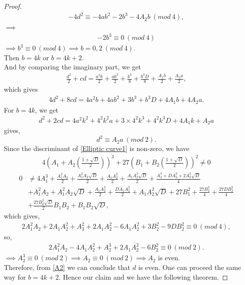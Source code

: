 \documentclass[10pt,a4paper]{amsart}
\begin{document}
\begin{proof}
\begin{align*}
         -4d^2\equiv -4ab^2-2b^3-4A_2b~(mod~4),
    \end{align*}
    $\implies$
    \begin{align*}
        -2b^3\equiv0~(mod~4)
    \end{align*}
   $\implies b^3\equiv0~(mod~4)\implies b=0,2~(mod~4)$.\\ 
   Then $b=4k$ or $b=4k+2$.\\
    And by comparing the imaginary part, we get
    \begin{align*}
        \frac{d^2}{2}+cd=\frac{a^2b}{2}+\frac{ab^2}{2}+\frac{b^3}{8}+\frac{b^3D}{8}+\frac{A_1b}{2}+\frac{A_2a}{2},
    \end{align*}
    which gives\\
    \begin{align*}
        4d^2+8cd=4a^2b+4ab^2+3b^3+b^3D+4A_1b+4A_2a.
    \end{align*}
    For $b=4k$, we get
    \begin{align*}
        d^2+2cd=4a^2k^2+4^2k^2a+3\times4^2k^3+4^2k^3D+4A_1k+A_2a
    \end{align*}
    gives,
    \begin{equation}\label{A2}
        d^2\equiv A_2a~(mod~2).
    \end{equation}
    Since the discriminant of \eqref{Elliptic curve1} is non-zero, we have
    \begin{align*}
        4\left(A_1+A_2\left(\frac{1+\sqrt{D}}{2}\right)\right)^3+27\left(B_1+B_2\left(\frac{1+\sqrt{D}}{2}\right)\right)^2\neq 0
    \end{align*}
    \begin{align*}
       0&\neq 4A_1^3+\frac{A_1^2A_2}{2}+\frac{A_1^2A_2\sqrt{D}}{2}+\frac{A_1A_2^2}{2}+\frac{A_1A_2^2\sqrt{D}}{2}+\frac{A_2^3+DA_2^3+2A_2^3\sqrt{D}}{4}\\&+A_1^2A_2+A_1^2A_2\sqrt{D}+\frac{A_1A_2^2}{2}+\frac{DA_1A_2^2}{2}+A_1A_2^2\sqrt{D}+27B_1^2+\frac{27B_2^2}{4}+\frac{27DB_2^2}{4}\\&+\frac{27B_2^2\sqrt{D}}{2}B_1B_2+B_1B_2\sqrt{D},
    \end{align*}
    which gives,
    \begin{align*}
        2A_1^2A_2+2A_1A_2^2+A_3^2+2A_1A_2^2-6A_1A_2^2+3B_2^2-9DB_2^2\equiv 0~(mod~4),
    \end{align*}
    so,
    \begin{align*}
        2A_1^2A_2-4A_1A_2^2+A_2^3+2A_1A_2^2-6B_2^2\equiv0~(mod~2).
    \end{align*}
    $\implies A_2^3\equiv 0~(mod~2)\implies A_2\equiv 0~(mod~2)\implies A_2$ is even. \\
    Therefore, from \eqref{A2} we can conclude that $d$ is even. One can proceed the same way for $b=4k+2$. Hence our claim and we have the following theorem.
\end{proof}
\end{document}
